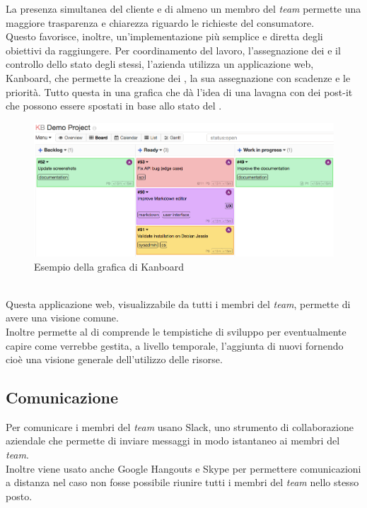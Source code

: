       La presenza simultanea del cliente e di almeno un membro del \textit{team} permette una maggiore trasparenza e chiarezza riguardo le richieste del consumatore.\\
      Questo favorisce, inoltre, un'implementazione più semplice e diretta degli obiettivi da raggiungere.
      \newpage
      Per coordinamento del lavoro, l'assegnazione dei  e il controllo dello stato degli stessi, l'azienda utilizza un applicazione web, Kanboard, che permette la creazione dei , la sua assegnazione con scadenze e le priorità.
      Tutto questa in una grafica che dà l'idea di una lavagna con dei post-it che possono essere spostati in base allo stato del .
      \begin{figure}[h]
        \centering
        \includegraphics[scale=0.3]{immagini/board.png}
        \caption{Esempio della grafica di Kanboard}
        \label{kan}
      \end{figure}\\
      Questa applicazione web, visualizzabile da tutti i membri del \textit{team}, permette di avere una visione comune.\\
      Inoltre permette al  di comprende le tempistiche di sviluppo per eventualmente capire come verrebbe gestita, a livello temporale, l'aggiunta di nuovi  fornendo cioè una visione generale dell'utilizzo delle risorse.
    \subsection{Comunicazione}
      Per comunicare i membri del \textit{team} usano Slack, uno strumento di collaborazione aziendale che permette di inviare messaggi in modo istantaneo ai membri del \textit{team}.\\
      Inoltre viene usato anche Google Hangouts e Skype per permettere comunicazioni a distanza nel caso non fosse possibile riunire tutti i membri del \textit{team} nello stesso posto.
